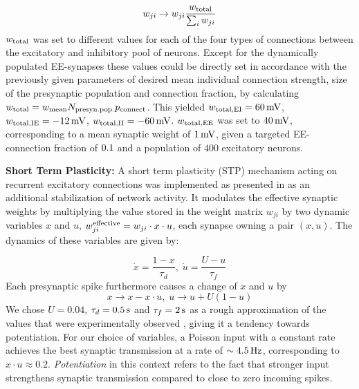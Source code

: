 \documentclass[10pt,letterpaper]{article}
\begin{document}
\begin{equation}
w_{ji} \rightarrow w_{ji} \frac{w_{\rm total}}{\sum_i w_{ji}}
\label{Synnnorm}
\end{equation}
$w_{\rm total}$ was set to different values for each of the four types of connections between the excitatory and inhibitory pool of neurons. Except for the dynamically populated EE-synapses these values could be directly set in accordance with the previously given parameters of desired mean individual connection strength, size of the presynaptic population and connection fraction, by calculating $w_{\rm total} = w_{\rm mean} N_{\rm presyn. pop.} p_{\rm connect}$. This yielded $w_{\rm total,EI} = \rm 60\, mV$, $w_{\rm total,IE} =\rm -12\, mV$, $w_{\rm total,II} = \rm -60\, mV$. $w_{\rm total,EE}$ was set to $\rm 40\, mV$,  corresponding to a mean synaptic weight of $\rm 1\, mV$, given a targeted EE-connection fraction of $\rm 0.1$ and a population of $400$ excitatory neurons.

\textbf{Short Term Plasticity:} A short term plasticity (STP) mechanism acting on recurrent excitatory connections was implemented as presented in \cite{Markram_STP} as an additional stabilization of network activity. It modulates the effective synaptic weights by multiplying the value stored in the weight matrix $w_{ji}$ by two dynamic variables $x$ and $u$, $w^{\rm effective}_{ji} = w_{ji}\cdot x \cdot u$, each synapse owning a pair $(x,u)$. The dynamics of these variables are given by:

\begin{equation}
\dot{x} = \frac{1-x}{\tau_d},\; \dot{u} = \frac{U-u}{\tau_f}
\label{STP_dynamics1}
\end{equation}
Each presynaptic spike furthermore causes a change of $x$ and $u$ by
\begin{equation}
x \rightarrow x - x\cdot u,\; u \rightarrow u + U(1-u)
\label{STP_dynamics2}
\end{equation}
We chose $U=0.04$, $\tau_d =\rm 0.5\, s$ and $\tau_f =\rm 2\, s$ as a rough approximation of the values that were experimentally observed \cite{Markram_STP}, giving it a tendency towards potentiation. For our choice of variables, a Poisson input with a constant rate achieves the best synaptic transmission at a rate of $\sim \rm 4.5\, Hz$, corresponding to $x\cdot u \approx 0.2$. \textit{Potentiation} in this context refers to the fact that stronger input strengthens synaptic transmission compared to close to zero incoming spikes.
\end{document}
